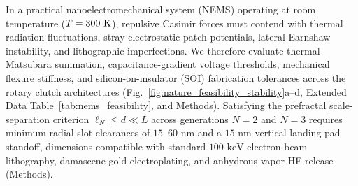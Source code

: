 \documentclass[pdflatex,sn-nature]{sn-jnl}
\begin{document}
In a practical nanoelectromechanical system (NEMS) operating at room temperature ($T = 300{}\text{ K}$), repulsive Casimir forces must contend with thermal radiation fluctuations, stray electrostatic patch potentials, lateral Earnshaw instability, and lithographic imperfections. We therefore evaluate thermal Matsubara summation, capacitance-gradient voltage thresholds, mechanical flexure stiffness, and silicon-on-insulator (SOI) fabrication tolerances across the rotary clutch architectures (Fig.~\ref{fig:nature_feasibility_stability}a--d, Extended Data Table~\ref{tab:nems_feasibility}, and Methods). Satisfying the prefractal scale-separation criterion\cite{gordon2026prd} $\ell_N \le d \ll L$ across generations $N=2$ and $N=3$ requires minimum radial slot clearances of $15\text{--}60\text{ nm}$ and a $15\text{ nm}$ vertical landing-pad standoff, dimensions compatible with standard $100\text{ keV}$ electron-beam lithography, damascene gold electroplating, and anhydrous vapor-HF release (Methods).
\end{document}
